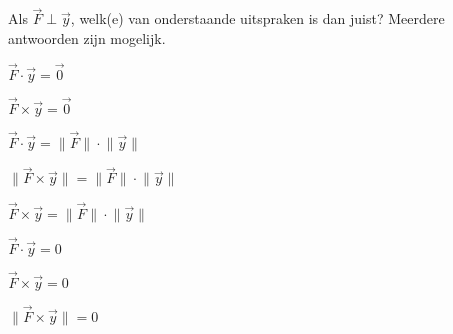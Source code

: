 \documentclass{ximera}
\begin{document}
\begin{exercise}
	\begin{image}[0.2\textwidth]
	\end{image}
\end{exercise}


\begin{exercise}


	
Als \(\vec{F} \; \bot \; \vec{y}\), welk(e) van onderstaande uitspraken is dan juist? 
Meerdere antwoorden zijn mogelijk. 

\begin{question}
\(\vec{F} \cdot \vec{y} = \vec{0}\)
\end{question}

\begin{question}
\(\vec{F} \times \vec{y} = \vec{0}\)
\end{question}

\begin{question}
\(\vec{F} \cdot \vec{y} = \lVert \vec{F} \rVert \cdot \lVert \vec{y} \rVert\)	
\end{question}

\begin{question}
\(\lVert \vec{F} \times \vec{y} \rVert = \lVert \vec{F} \rVert \cdot \lVert \vec{y} \rVert\)	
\end{question}

\begin{question}
\(\vec{F} \times \vec{y} = \lVert \vec{F} \rVert \cdot \lVert \vec{y} \rVert\)	
\end{question}

\begin{question}
\(\vec{F} \cdot \vec{y} = 0\)
\end{question}

\begin{question}
\(\vec{F} \times \vec{y} = 0\)
\end{question}

\begin{question}
\(\lVert \vec{F} \times \vec{y} \rVert = 0\)
\end{question}

\end{exercise}
\end{document}
